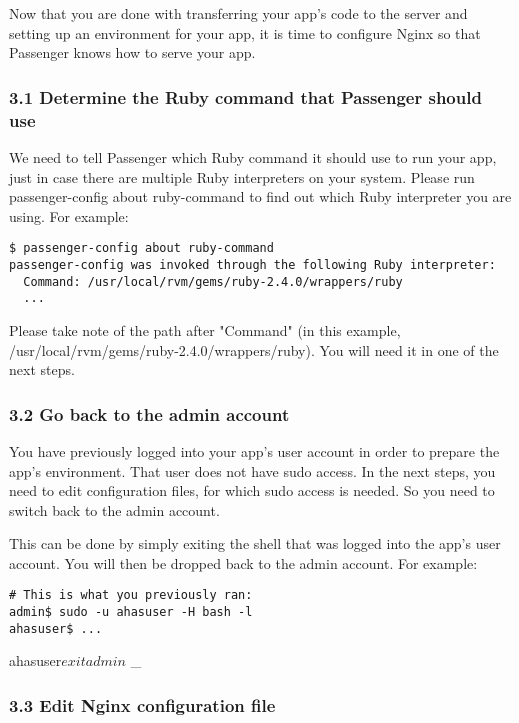 \documentclass[11pt]{article}
\begin{document}
Now that you are done with transferring your app's code to the server and setting up an environment for your app, it is time to configure Nginx so that Passenger knows how to serve your app.

\subsubsection{3.1 Determine the Ruby command that Passenger should use}
\label{sec:org338ec6e}

We need to tell Passenger which Ruby command it should use to run your app, just in case there are multiple Ruby interpreters on your system. Please run passenger-config about ruby-command to find out which Ruby interpreter you are using. For example:

\begin{verbatim}
$ passenger-config about ruby-command
passenger-config was invoked through the following Ruby interpreter:
  Command: /usr/local/rvm/gems/ruby-2.4.0/wrappers/ruby
  ...
\end{verbatim}

Please take note of the path after "Command" (in this example, /usr/local/rvm/gems/ruby-2.4.0/wrappers/ruby). You will need it in one of the next steps.

\subsubsection{3.2 Go back to the admin account}
\label{sec:orgc23d316}

You have previously logged into your app's user account in order to prepare the app's environment. That user does not have sudo access. In the next steps, you need to edit configuration files, for which sudo access is needed. So you need to switch back to the admin account.

This can be done by simply exiting the shell that was logged into the app's user account. You will then be dropped back to the admin account. For example:

\begin{verbatim}
# This is what you previously ran:
admin$ sudo -u ahasuser -H bash -l
ahasuser$ ...
\end{verbatim}

ahasuser\(exit
admin\) \_

\subsubsection{3.3 Edit Nginx configuration file}
\label{sec:org89a9055}
\end{document}
